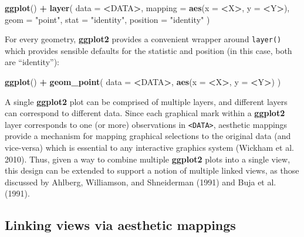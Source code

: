\documentclass[12pt,]{article}
\newenvironment{Shaded}{\begin{snugshade}}{\end{snugshade}}
\newcommand{\DataTypeTok}[1]{\textcolor[rgb]{0.13,0.29,0.53}{#1}}
\newcommand{\KeywordTok}[1]{\textcolor[rgb]{0.13,0.29,0.53}{\textbf{#1}}}
\newcommand{\NormalTok}[1]{#1}
\newcommand{\OperatorTok}[1]{\textcolor[rgb]{0.81,0.36,0.00}{\textbf{#1}}}
\newcommand{\StringTok}[1]{\textcolor[rgb]{0.31,0.60,0.02}{#1}}
\theoremstyle{definition}
\theoremstyle{definition}
\theoremstyle{definition}
\theoremstyle{remark}
\begin{document}
\begin{Shaded}
\begin{Highlighting}[]
\KeywordTok{ggplot}\NormalTok{() }\OperatorTok{+}\StringTok{ }\KeywordTok{layer}\NormalTok{(}
  \DataTypeTok{data =} \OperatorTok{<}\NormalTok{DATA}\OperatorTok{>}\NormalTok{, }
  \DataTypeTok{mapping =} \KeywordTok{aes}\NormalTok{(}\DataTypeTok{x =} \OperatorTok{<}\NormalTok{X}\OperatorTok{>}\NormalTok{, }\DataTypeTok{y =} \OperatorTok{<}\NormalTok{Y}\OperatorTok{>}\NormalTok{), }
  \DataTypeTok{geom =} \StringTok{"point"}\NormalTok{, }
  \DataTypeTok{stat =} \StringTok{"identity"}\NormalTok{,}
  \DataTypeTok{position =} \StringTok{"identity"}
\NormalTok{)}
\end{Highlighting}
\end{Shaded}

For every geometry, \textbf{ggplot2} provides a convenient wrapper
around \texttt{layer()} which provides sensible defaults for the
statistic and position (in this case, both are ``identity''):

\begin{Shaded}
\begin{Highlighting}[]
\KeywordTok{ggplot}\NormalTok{() }\OperatorTok{+}\StringTok{ }\KeywordTok{geom_point}\NormalTok{(}
  \DataTypeTok{data =} \OperatorTok{<}\NormalTok{DATA}\OperatorTok{>}\NormalTok{, }
  \KeywordTok{aes}\NormalTok{(}\DataTypeTok{x =} \OperatorTok{<}\NormalTok{X}\OperatorTok{>}\NormalTok{, }\DataTypeTok{y =} \OperatorTok{<}\NormalTok{Y}\OperatorTok{>}\NormalTok{)}
\NormalTok{)}
\end{Highlighting}
\end{Shaded}

A single \textbf{ggplot2} plot can be comprised of multiple layers, and
different layers can correspond to different data. Since each graphical
mark within a \textbf{ggplot2} layer corresponds to one (or more)
observations in \texttt{\textless{}DATA\textgreater{}}, aesthetic
mappings provide a mechanism for mapping graphical selections to the
original data (and vice-versa) which is essential to any interactive
graphics system (Wickham et al. 2010). Thus, given a way to combine
multiple \textbf{ggplot2} plots into a single view, this design can be
extended to support a notion of multiple linked views, as those
discussed by Ahlberg, Williamson, and Shneiderman (1991) and Buja et al.
(1991).

\hypertarget{extension}{%
\subsection{Linking views via aesthetic mappings}\label{extension}}
\end{document}
